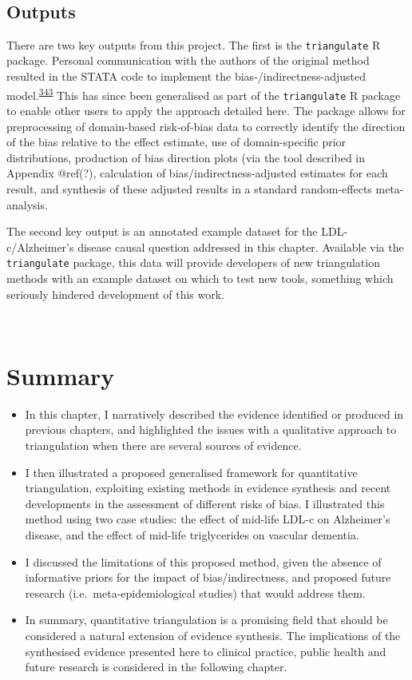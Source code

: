 \documentclass[a4paper, twoside]{templates/ociamthesis}
\begin{document}
~

\hypertarget{tri-software}{%
\subsection{Outputs}\label{tri-software}}

There are two key outputs from this project. The first is the \texttt{triangulate} R package. Personal communication with the authors of the original method resulted in the STATA code to implement the bias-/indirectness-adjusted model.\textsuperscript{\protect\hyperlink{ref-turner2009}{343}} This has since been generalised as part of the \texttt{triangulate} R package to enable other users to apply the approach detailed here. The package allows for preprocessing of domain-based risk-of-bias data to correctly identify the direction of the bias relative to the effect estimate, use of domain-specific prior distributions, production of bias direction plots (via the tool described in Appendix @ref(?), calculation of bias/indirectness-adjusted estimates for each result, and synthesis of these adjusted results in a standard random-effects meta-analysis.

The second key output is an annotated example dataset for the LDL-c/Alzheimer's disease causal question addressed in this chapter. Available via the \texttt{triangulate} package, this data will provide developers of new triangulation methods with an example dataset on which to test new tools, something which seriously hindered development of this work.

~

\hypertarget{summary-6}{%
\section{Summary}\label{summary-6}}

\begin{itemize}
\item
  In this chapter, I narratively described the evidence identified or produced in previous chapters, and highlighted the issues with a qualitative approach to triangulation when there are several sources of evidence.
\item
  I then illustrated a proposed generalised framework for quantitative triangulation, exploiting existing methods in evidence synthesis and recent developments in the assessment of different risks of bias. I illustrated this method using two case studies: the effect of mid-life LDL-c on Alzheimer's disease, and the effect of mid-life triglycerides on vascular dementia.
\item
  I discussed the limitations of this proposed method, given the absence of informative priors for the impact of bias/indirectness, and proposed future research (i.e.~meta-epidemiological studies) that would address them.
\item
  In summary, quantitative triangulation is a promising field that should be considered a natural extension of evidence synthesis. The implications of the synthesised evidence presented here to clinical practice, public health and future research is considered in the following chapter.
\end{itemize}
\end{document}
